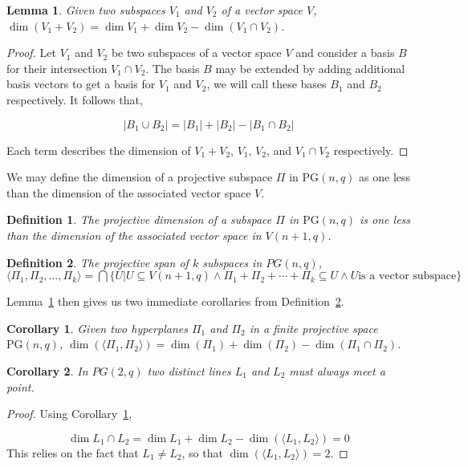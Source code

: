 \documentclass{article}
\newtheorem{lemma}{Lemma}
\newtheorem{corollary}{Corollary}
\newtheorem{definition}{Definition}
\newcommand{\PG}{\mathrm{PG}}
\begin{document}
\begin{lemma}\label{lemma:2}
  Given two subspaces \(V_1\) and \(V_2\) of a vector space \(V\), \(\dim (V_1 + V_2) = \dim V_1 + \dim V_2 - \dim (V_1 \cap V_2)\).
\end{lemma}

\begin{proof}
  Let \(V_1\) and \(V_2\) be two subspaces of a vector space \(V\) and consider a basis \(B\) for their intersection \(V_1 \cap V_2\). The basis \(B\) may be extended by adding additional basis vectors to get a basis for \(V_1\) and \(V_2\), we will call these bases \(B_1\) and \(B_2\) respectively.
  It follows that,

  \begin{equation*}
    | B_1 \cup B_2 | = |B_1| + |B_2| - |B_1 \cap B_2|
  \end{equation*}

  Each term describes the dimension of \(V_1 + V_2\), \(V_1\), \(V_2\), and \(V_1 \cap V_2\) respectively.
\end{proof}

We may define the dimension of a projective subspace \(\Pi\) in \(\PG(n, q)\) as one less than the dimension of the associated vector space \(V\).
\begin{definition}
  The projective dimension of a subspace \(\Pi\) in \(\PG(n, q)\) is one less than the dimension of the associated vector space in \(V(n + 1, q)\).
\end{definition}

\begin{definition}\label{def:1}
  The projective span of \(k\) subspaces in \(PG(n, q)\), \(\langle \Pi_1, \Pi_2, \ldots, \Pi_k \rangle = \bigcap \{U  | U \subseteq V(n + 1, q) \land \Pi_1 + \Pi_2 + \cdots + \Pi_k \subseteq U \land U \text{is a vector subspace}\}\)
\end{definition}

Lemma~\ref{lemma:2} then gives us two immediate corollaries from Definition~\ref{def:1}.
\begin{corollary}\label{cor:1}
  Given two hyperplanes \(\Pi_1\) and \(\Pi_2\) in a finite projective space \(\PG(n, q)\), \(\dim(\langle \Pi_1, \Pi_2 \rangle) = \dim (\Pi_1) + \dim (\Pi_2) - \dim (\Pi_1 \cap \Pi_2)\).
\end{corollary}

\begin{corollary}
  In \(PG(2, q)\) two distinct lines \(L_1\) and \(L_2\) must always meet a point.
\end{corollary}
\begin{proof}
  Using Corollary~\ref{cor:1},

  \begin{equation*}
    \dim L_1 \cap L_2 = \dim L_1 + \dim L_2 - \dim (\langle L_1, L_2 \rangle) = 0
  \end{equation*}
  This relies on the fact that \(L_1 \neq L_2\), so that \(\dim (\langle L_1, L_2 \rangle) = 2\).
\end{proof}
\end{document}
